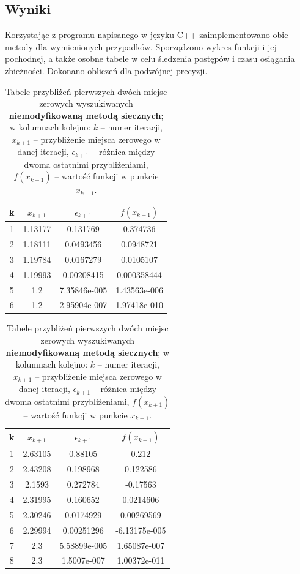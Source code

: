 \subsection{Wyniki}

Korzystając z programu napisanego w języku C++ zaimplementowano obie metody dla wymienionych przypadków. Sporządzono wykres funkcji i jej pochodnej, a także osobne tabele w celu śledzenia postępów i czasu osiągania zbieżności. Dokonano obliczeń dla podwójnej precyzji.

\begin{table}[!hb]
	\centering
	\label{pierwsze}
	\caption{Tabele przybliżeń pierwszych dwóch miejsc zerowych wyszukiwanych \textbf{niemodyfikowaną metodą siecznych}; w kolumnach kolejno: $ k $ – numer iteracji, $ x_{k+1} $ – przybliżenie miejsca zerowego w danej iteracji, $\epsilon_{k+1}$ – różnica między dwoma ostatnimi przybliżeniami, $ f(x_{k+1}) $ – wartość funkcji w punkcie $ x_{k+1} $.}

	\begin{tabular}{|c|c|c|c|}
	\hline
	k&$x_{k+1}$&$\epsilon_{k+1} $&$ f(x_{k+1})$ \\ \hline
	1&1.13177&0.131769&0.374736 \\ \hline
	2&1.18111&0.0493456&0.0948721 \\ \hline
	3&1.19784&0.0167279&0.0105107 \\ \hline
	4&1.19993&0.00208415&0.000358444 \\ \hline
	5&1.2&7.35846e-005&1.43563e-006 \\ \hline
	6&1.2&2.95904e-007&1.97418e-010 \\ \hline
	\end{tabular}
\hfill
	\begin{tabular}{|c|c|c|c|}
		\hline
		k&$x_{k+1}$&$\epsilon_{k+1} $&$ f(x_{k+1})$ \\ \hline
		1&2.63105&0.88105&0.212 \\ \hline
		2&2.43208&0.198968&0.122586 \\ \hline
		3&2.1593&0.272784&-0.17563 \\ \hline
		4&2.31995&0.160652&0.0214606 \\ \hline
		5&2.30246&0.0174929&0.00269569 \\ \hline
		6&2.29994&0.00251296&-6.13175e-005 \\ \hline
		7&2.3&5.58899e-005&1.65087e-007 \\ \hline
		8&2.3&1.5007e-007&1.00372e-011 \\ \hline
	\end{tabular}
\end{table}

